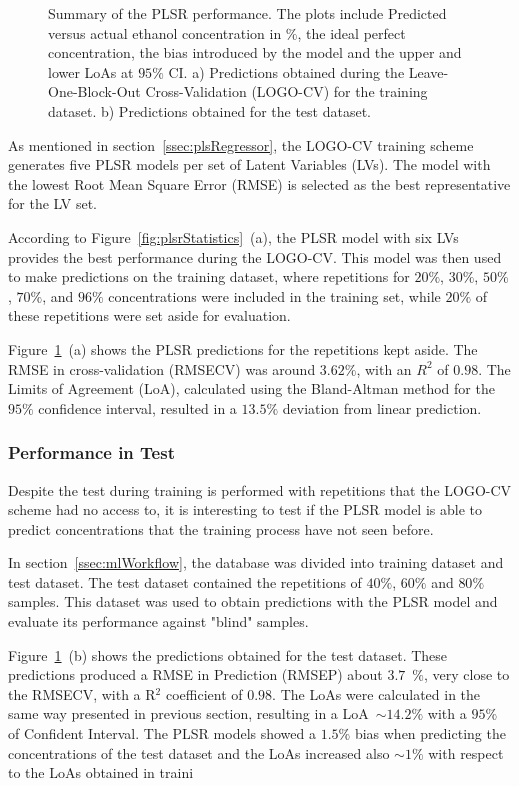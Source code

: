 \documentclass[journal,twoside,web]{ieeecolor}
\begin{document}
\begin{figure}[!t]
	\caption{Summary of the PLSR performance. The plots include Predicted versus actual ethanol concentration in $\%$, the ideal perfect concentration, the bias introduced by the model and the upper and lower LoAs at $95\%$ CI. a) Predictions obtained during the Leave-One-Block-Out Cross-Validation (LOGO-CV) for the training dataset. b) Predictions obtained for the test dataset.}
	\vspace{-0.3cm}
	\label{fig:plsrResults}
\end{figure}

As mentioned in section~\ref{ssec:plsRegressor}, the LOGO-CV training scheme generates five PLSR models per set of Latent Variables (LVs). The model with the lowest Root Mean Square Error (RMSE) is selected as the best representative for the LV set.

According to Figure~\ref{fig:plsrStatistics}~(a), the PLSR model with six LVs provides the best performance during the LOGO-CV. This model was then used to make predictions on the training dataset, where repetitions for $20\%$, $30\%$, $50\%$, $70\%$, and $96\%$ concentrations were included in the training set, while $20\%$ of these repetitions were set aside for evaluation.

Figure~\ref{fig:plsrResults}~(a) shows the PLSR predictions for the repetitions kept aside. The RMSE in cross-validation (RMSECV) was around $3.62\%$, with an $R^{2}$ of $0.98$. The Limits of Agreement (LoA), calculated using the Bland-Altman method for the $95\%$ confidence interval, resulted in a $13.5\%$ deviation from linear prediction.
 
\subsubsection{Performance in Test}
\label{sssec:perfTest}

Despite the test during training is performed with repetitions that the LOGO-CV scheme had no access to, it is interesting to test if the PLSR model is able to predict concentrations that the training process have not seen before. 

In section~\ref{ssec:mlWorkflow}, the database was divided into training dataset and test dataset. The test dataset contained the repetitions of $40\%$, $60\%$ and $80\%$ samples. This dataset was used to obtain predictions with the PLSR model and evaluate its performance against "blind" samples.

Figure~\ref{fig:plsrResults}~(b) shows the predictions obtained for the test dataset. These predictions produced a RMSE in Prediction (RMSEP) about $3.7$~$\%$, very close to the RMSECV, with a R$^{2}$ coefficient of $0.98$. The LoAs were calculated in the same way presented in previous section, resulting in a LoA~$\sim14.2\%$ with a $95\%$ of Confident Interval. The PLSR models showed a $1.5\%$ bias when predicting the concentrations of the test dataset and the LoAs increased also $\sim1\%$ with respect to the LoAs obtained in traini
\end{document}
